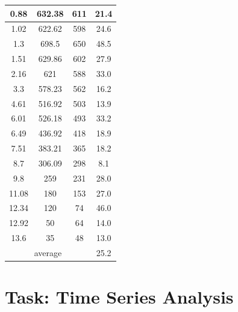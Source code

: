 \documentclass{article}
\begin{document}
\begin{table}[ht]
\begin{tabular}{|c|c|c|c|}
0.88            & 632.38               & 611                    & 21.4                 \\ \hline
1.02            & 622.62               & 598                    & 24.6                 \\ \hline
1.3             & 698.5                & 650                    & 48.5                 \\ \hline
1.51            & 629.86               & 602                    & 27.9                 \\ \hline
2.16            & 621                  & 588                    & 33.0                 \\ \hline
3.3             & 578.23               & 562                    & 16.2                 \\ \hline
4.61            & 516.92               & 503                    & 13.9                 \\ \hline
6.01            & 526.18               & 493                    & 33.2                 \\ \hline
6.49            & 436.92               & 418                    & 18.9                 \\ \hline
7.51            & 383.21               & 365                    & 18.2                 \\ \hline
8.7             & 306.09               & 298                    & 8.1                  \\ \hline
9.8             & 259                  & 231                    & 28.0                 \\ \hline
11.08           & 180                  & 153                    & 27.0                 \\ \hline
12.34           & 120                  & 74                     & 46.0                 \\ \hline
12.92           & 50                   & 64                     & 14.0                 \\ \hline
13.6            & 35                   & 48                     & 13.0                 \\ \hline
\multicolumn{3}{|c|}{average}                                   & 25.2                 \\ \hline
\end{tabular}
\end{table}

\FloatBarrier
\clearpage


\section{Task: Time Series Analysis}
\end{document}
